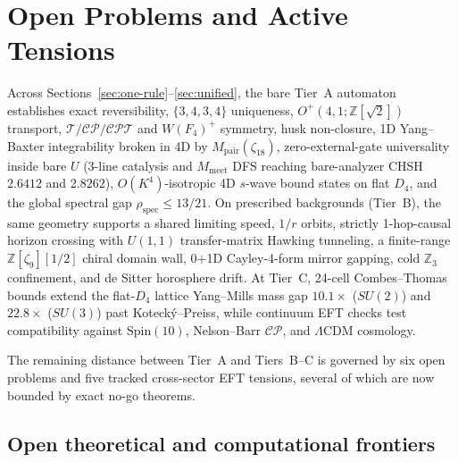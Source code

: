 \section{Open Problems and Active Tensions}
\label{sec:open}

Across Sections~\ref{sec:one-rule}--\ref{sec:unified}, the bare Tier~A automaton establishes exact reversibility,
$\{3,4,3,4\}$ uniqueness, $O^+(4,1; \mathbb{Z}[\sqrt{2}])$ transport, $\mathcal{T}/\mathcal{CP}/\mathcal{CPT}$ and
$W(F_4)^+$ symmetry, husk non-closure, 1D Yang--Baxter integrability broken in 4D by $M_{\mathrm{pair}}(\zeta_{18})$,
zero-external-gate universality inside bare $U$ (3-line catalysis and $M_{\mathrm{meet}}$ DFS reaching bare-analyzer
CHSH $2.6412$ and $2.8262$), $O(K^4)$-isotropic 4D $s$-wave bound states on flat $D_4$, and the global spectral gap
$\rho_{\mathrm{spec}} \le 13/21$. On prescribed backgrounds (Tier~B), the same geometry supports a shared limiting
speed, $1/r$ orbits, strictly 1-hop-causal horizon crossing with $U(1,1)$ transfer-matrix Hawking tunneling, a
finite-range $\mathbb{Z}[\zeta_9][1/2]$ chiral domain wall, 0+1D Cayley-4-form mirror gapping, cold $\mathbb{Z}_3$
confinement, and de Sitter horosphere drift. At Tier~C, 24-cell Combes--Thomas bounds extend the flat-$D_4$ lattice
Yang--Mills mass gap $10.1\times$ ($SU(2)$) and $22.8\times$ ($SU(3)$) past Koteck\'y--Preiss, while continuum EFT
checks test compatibility against $\mathrm{Spin}(10)$, Nelson--Barr $\mathcal{CP}$, and $\Lambda$CDM cosmology.

The remaining distance between Tier~A and Tiers~B--C is governed by six open problems and five tracked cross-sector
EFT tensions, several of which are now bounded by exact no-go theorems.

\subsection{Open theoretical and computational frontiers}

